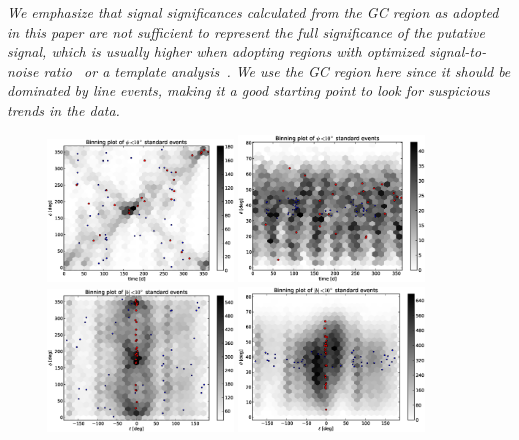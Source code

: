 \documentclass[aps,twocolumn,prd,superscriptaddress,showpacs,nofootinbib,fixfloat]{revtex4}
\begin{document}
\emph{We emphasize that signal significances calculated from the GC region as
adopted in this paper are not sufficient to represent the full significance of
the putative signal, which is usually higher when adopting regions with
optimized signal-to-noise ratio~\cite{Weniger:2012} or a template
analysis~\cite{linepaper}. We use the GC region here since it should be
dominated by line events, making it a good starting point to look for
suspicious trends in the data.}



\begin{figure}
  \centering
  \includegraphics[width=0.44\textwidth]{plots/TIME_PHI.eps}
  \includegraphics[width=0.44\textwidth]{plots/TIME_THETA.eps}
  \includegraphics[width=0.44\textwidth]{plots/L_PHI.eps}
  \includegraphics[width=0.44\textwidth]{plots/L_THETA.eps}

\end{figure}
\end{document}
